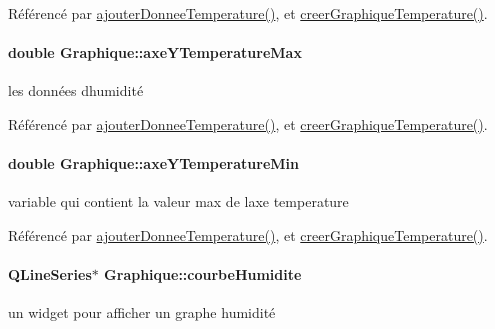 Référencé par \hyperlink{class_graphique_a42b3c986ca86c426adbb8fdb03a04380}{ajouter\+Donnee\+Temperature()}, et \hyperlink{class_graphique_ad9b976804bafcbfe451d89fd35729d16}{creer\+Graphique\+Temperature()}.

\paragraph[{\texorpdfstring{axe\+Y\+Temperature\+Max}{axeYTemperatureMax}}]{\setlength{\rightskip}{0pt plus 5cm}double Graphique\+::axe\+Y\+Temperature\+Max\hspace{0.3cm}{\ttfamily [private]}}\hypertarget{class_graphique_a6aac1bb5ad9a78cb91ca64359e7da307}{}\label{class_graphique_a6aac1bb5ad9a78cb91ca64359e7da307}
les données d\textquotesingle{}humidité 

Référencé par \hyperlink{class_graphique_a42b3c986ca86c426adbb8fdb03a04380}{ajouter\+Donnee\+Temperature()}, et \hyperlink{class_graphique_ad9b976804bafcbfe451d89fd35729d16}{creer\+Graphique\+Temperature()}.

\paragraph[{\texorpdfstring{axe\+Y\+Temperature\+Min}{axeYTemperatureMin}}]{\setlength{\rightskip}{0pt plus 5cm}double Graphique\+::axe\+Y\+Temperature\+Min\hspace{0.3cm}{\ttfamily [private]}}\hypertarget{class_graphique_ad0971f340d49a40c14376a0e0a985f81}{}\label{class_graphique_ad0971f340d49a40c14376a0e0a985f81}
variable qui contient la valeur max de l\textquotesingle{}axe temperature 

Référencé par \hyperlink{class_graphique_a42b3c986ca86c426adbb8fdb03a04380}{ajouter\+Donnee\+Temperature()}, et \hyperlink{class_graphique_ad9b976804bafcbfe451d89fd35729d16}{creer\+Graphique\+Temperature()}.

\paragraph[{\texorpdfstring{courbe\+Humidite}{courbeHumidite}}]{\setlength{\rightskip}{0pt plus 5cm}Q\+Line\+Series$\ast$ Graphique\+::courbe\+Humidite\hspace{0.3cm}{\ttfamily [private]}}\hypertarget{class_graphique_a1ff987d94beb7c471a85be00e881d64c}{}\label{class_graphique_a1ff987d94beb7c471a85be00e881d64c}
un widget pour afficher un graphe humidité 

